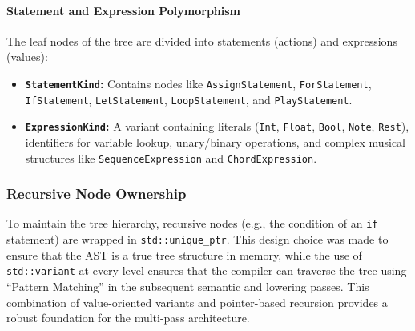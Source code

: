 \paragraph{Statement and Expression Polymorphism}
The leaf nodes of the tree are divided into statements (actions) and expressions (values):
\begin{itemize}
  \item \textbf{\texttt{StatementKind}:} Contains nodes like \texttt{AssignStatement}, \texttt{ForStatement},
    \texttt{IfStatement}, \texttt{LetStatement}, \texttt{LoopStatement}, and \texttt{PlayStatement}.
  \item \textbf{\texttt{ExpressionKind}:} A variant containing literals (\texttt{Int}, \texttt{Float}, \texttt{Bool},
    \texttt{Note}, \texttt{Rest}), identifiers for variable lookup, unary/binary operations, and complex musical
    structures like \texttt{SequenceExpression} and \texttt{ChordExpression}.
\end{itemize}

\subsubsection{Recursive Node Ownership}

To maintain the tree hierarchy, recursive nodes (e.g., the condition of an \texttt{if} statement) are wrapped in
\texttt{std::unique\_ptr}.
This design choice was made to ensure that the AST is a true tree structure in memory, while the use of
\texttt{std::variant} at every level ensures that the compiler can traverse the tree using ``Pattern Matching'' in the
subsequent semantic and lowering passes.
This combination of value-oriented variants and pointer-based recursion provides a robust foundation for the multi-pass
architecture.
